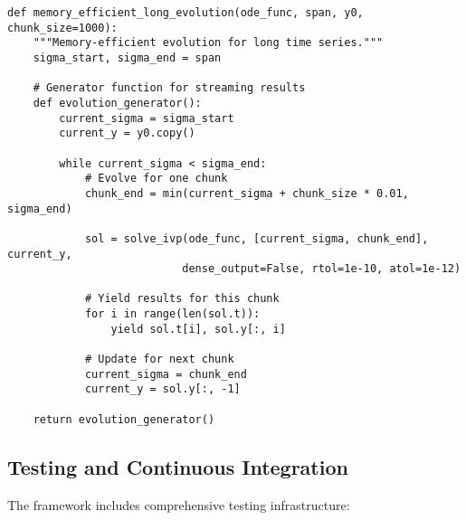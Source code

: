 \begin{verbatim}
def memory_efficient_long_evolution(ode_func, span, y0, chunk_size=1000):
    """Memory-efficient evolution for long time series."""
    sigma_start, sigma_end = span
    
    # Generator function for streaming results
    def evolution_generator():
        current_sigma = sigma_start
        current_y = y0.copy()
        
        while current_sigma < sigma_end:
            # Evolve for one chunk
            chunk_end = min(current_sigma + chunk_size * 0.01, sigma_end)
            
            sol = solve_ivp(ode_func, [current_sigma, chunk_end], current_y,
                           dense_output=False, rtol=1e-10, atol=1e-12)
            
            # Yield results for this chunk
            for i in range(len(sol.t)):
                yield sol.t[i], sol.y[:, i]
            
            # Update for next chunk
            current_sigma = chunk_end
            current_y = sol.y[:, -1]
    
    return evolution_generator()
\end{verbatim}

\subsection{Testing and Continuous Integration}
\label{app:testing_ci}

The framework includes comprehensive testing infrastructure:

